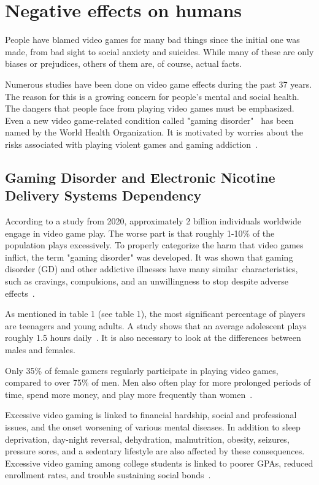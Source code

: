 \documentclass[10pt,twoside,english,a4paper]{article}
\begin{document}
\section{Negative effects on humans}
People have blamed video games for many bad things since the initial one was made, from bad sight to social anxiety and suicides. While many of these are only biases or prejudices, others of them are, of course, actual facts.

Numerous studies have been done on video game effects during the past 37 years. The reason for this is a growing concern for people's mental and social health. The dangers that people face from playing video games must be emphasized. Even a new video game-related condition called "gaming disorder"~\cite{children,disorder} has been named by the World Health Organization. It is motivated by worries about the risks associated with playing violent games and gaming addiction~\cite{children}.

\subsection{Gaming Disorder and Electronic Nicotine Delivery Systems Dependency}
According to a study from 2020, approximately 2 billion individuals worldwide engage in video game play. The worse part is that roughly 1-10\% of the population plays excessively. To properly categorize the harm that video games inflict, the term "gaming disorder" was developed. It was shown that gaming disorder (GD) and other addictive illnesses have many similar characteristics, such as cravings, compulsions, and an unwillingness to stop despite adverse effects~\cite{disorder}.

As mentioned in table 1 (see table 1), the most significant percentage of players are teenagers and young adults. A study shows that an average adolescent plays roughly 1.5 hours daily~\cite{disorder}. It is also necessary to look at the differences between males and females.

Only 35\% of female gamers regularly participate in playing video games, compared to over 75\% of men. Men also often play for more prolonged periods of time, spend more money, and play more frequently than women~\cite{disorder}. 

Excessive video gaming is linked to financial hardship, social and professional issues, and the onset worsening of various mental diseases. In addition to sleep deprivation, day-night reversal, dehydration, malnutrition, obesity, seizures, pressure sores, and a sedentary lifestyle are also affected by these consequences. Excessive video gaming among college students is linked to poorer GPAs, reduced enrollment rates, and trouble sustaining social bonds~\cite{disorder}.
\end{document}
